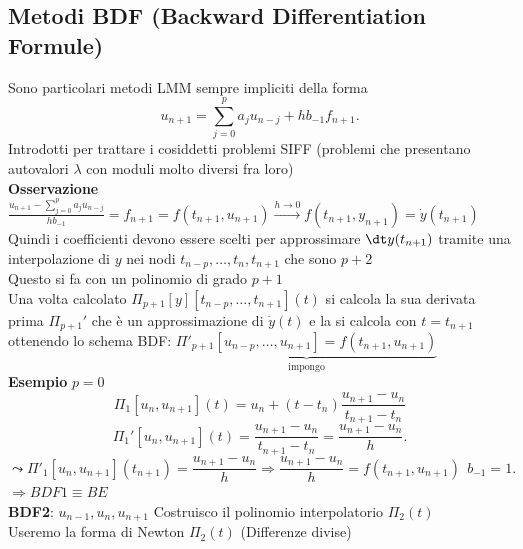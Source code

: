 \documentclass[12px]{article}
\begin{document}
	\subsection{Metodi BDF (Backward Differentiation Formule)}
	Sono particolari metodi LMM sempre impliciti della forma
	 \[
		 u_{n+1} = \sum^{p}_{j=0}a_ju_{n-j} + h b_{-1}f_{n+1}
	.\] 
	Introdotti per trattare i cosiddetti problemi SIFF (problemi che presentano autovalori $\lambda$ con moduli molto diversi fra loro)\\
	\textbf{Osservazione}\\[5px]
	$\displaystyle \frac{u_{n+1} - \sum^{p}_{j=0}a_ju_{n-j}}{hb_{-1}} = f_{n+1} = f(t_{n+1},u_{n+1}) \xrightarrow{h \rightarrow 0} f(t_{n+1},y_{n+1}) = \dot y(t_{n+1})$\\
	Quindi i coefficienti devono essere scelti per approssimare $\dt y(t_{n+1})$ tramite una interpolazione di  $y$ nei nodi $t_{n-p},\ldots, t_n, t_{n+1}$ che sono  $p+2$\\
	Questo si fa con un polinomio di grado $p+1$\\
	Una volta calcolato  $\Pi_{p+1}[y][t_{n-p},\ldots,t_{n+1}](t)$ si calcola la sua derivata prima  $\Pi_{p+1}'$ che è un approssimazione di  $\dot y(t)$ e la si calcola con $t = t_{n+1}$ ottenendo lo schema BDF:  $\underbrace{\Pi'_{p+1}[u_{n-p},\ldots,u_{n+1}] = f(t_{n+1},u_{n+1})}_{\text{impongo}}$\\
	\textbf{Esempio} $ p = 0$\\
\[\Pi_1[u_n,u_{n+1}](t) = u_n + (t-t_n)\frac{u_{n+1}-u_n}{t_{n+1}-t_n}\]
\[
	\Pi_1'[u_n,u_{n+1}](t) = \frac{ u_{n+1} - u_n}{t_{n+1}-t_n} = \frac {u_{n+1}-u_n}h
.\] 
\[
	\leadsto \Pi'_1[u_{n},u_{n+1}](t_{n+1}) = \frac{u_{n+1} - u_n}h \Rightarrow \frac{u_{n+1}-u_n}{h} = f(t_{n+1},u_{n+1}) \ \ b_{-1} =1
.\] 
$ \Rightarrow BDF1 \equiv BE$ \\
\textbf{BDF2}: $u_{n-1},u_n,u_{n+1}$ Costruisco il polinomio interpolatorio  $\Pi_2(t)$\\
Useremo la forma di Newton $\Pi_2(t)$ (Differenze divise)\\
\end{document}
